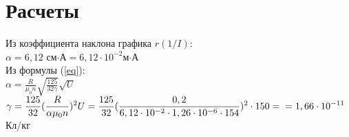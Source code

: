\documentclass[12pt]{article}
\begin{document}
	\section{Расчеты}
	Из коэффициента наклона графика $r(1/I)$:\\
	$\displaystyle\alpha = 6,12$ см$\cdot$А$=6,12\cdot10^{-2}$м$\cdot$А\\
	Из формулы (\ref{eq}):\\
	$\displaystyle\alpha = \frac{R}{\mu_0n}\sqrt{\frac{125}{32\gamma}}\sqrt{U}$\\
	$\displaystyle\gamma=\frac{125}{32}(\frac{R}{\alpha\mu_0n})^2U=\frac{125}{32}(\frac{0,2}{6,12\cdot10^{-2}\cdot1,26\cdot10^{-6}\cdot154})^2\cdot 150=\\=1,66\cdot10^{-11}$Кл/кг
\end{document}

